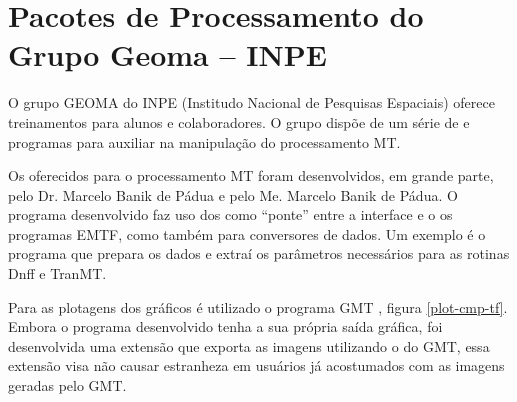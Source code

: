             
            
           
           
    \section{Pacotes de Processamento do Grupo Geoma -- INPE}
    
        O grupo GEOMA do INPE (Institudo Nacional de Pesquisas Espaciais) oferece treinamentos para alunos e colaboradores. O grupo dispõe de um série de  e programas para auxiliar na manipulação do processamento MT.

        Os  oferecidos para o processamento MT foram desenvolvidos, em grande parte, pelo Dr. Marcelo Banik de Pádua e pelo Me. Marcelo Banik de Pádua. O programa desenvolvido faz uso dos  como ``ponte'' entre a interface e o os programas EMTF, como também para conversores de dados. Um exemplo é o programa  que prepara os dados e extraí os parâmetros necessários para as rotinas Dnff e TranMT. 
        
        Para as plotagens dos gráficos é utilizado o programa GMT \cite{gmt}, figura \ref{plot-cmp-tf}. Embora o programa desenvolvido tenha a sua própria saída gráfica, foi desenvolvida uma extensão que exporta as imagens utilizando o  do GMT, essa extensão visa não causar estranheza em usuários já acostumados com as imagens geradas pelo GMT.  
    
